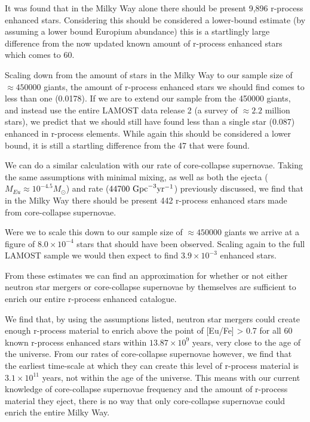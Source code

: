 \documentclass[a4paper,fleqn,usenatbib]{mnras}
\begin{document}
    It was found that in the Milky Way alone there should be present 9,896 r-process enhanced stars. Considering this should be considered a lower-bound estimate (by assuming a lower bound Europium abundance) this is a startlingly large difference from the now updated known amount of r-process enhanced stars which comes to 60. 
    
    Scaling down from the amount of stars in the Milky Way to our sample size of $\approx450000$ giants, the amount of r-process enhanced stars we should find comes to less than one (0.0178). If we are to extend our sample from the 450000 giants, and instead use the entire LAMOST data release 2 (a survey of $\approx2.2$ million stars), we predict that we should still have found less than a single star (0.087)  enhanced in r-process elements. While again this should be considered a lower bound, it is still a startling difference from the 47 that were found.
    
    We can do a similar calculation with our rate of core-collapse supernovae. Taking the same assumptions with minimal mixing, as well as both the ejecta ($M_{Eu}\approx10^{-4.5} M_{\odot}$) and rate ($44700\ \rm{Gpc}^{-3} \rm{yr^{-1}}$) previously discussed, we find that in the Milky Way there should be present 442 r-process enhanced stars made from core-collapse supernovae.
    
    Were we to scale this down to our sample size of $\approx450000$ giants we arrive at a figure of $8.0\times10^{-4}$ stars that should have been observed. Scaling again to the full LAMOST sample we would then expect to find $3.9\times10^{-3}$ enhanced stars. 
    
    From these estimates we can find an approximation for whether or not either neutron star mergers or core-collapse supernovae by themselves are sufficient to enrich our entire r-process enhanced catalogue. 
    
    We find that, by using the assumptions listed, neutron star mergers could create enough r-process material to enrich above the point of [Eu/Fe] > 0.7 for all 60 known r-process enhanced stars within $13.87\times10^9$ years, very close to the age of the universe. From our rates of core-collapse supernovae however, we find that the earliest time-scale at which they can create this level of r-process material is $3.1\times10^{11}$ years, not within the age of the universe. This means with our current knowledge of core-collapse supernovae frequency and the amount of r-process material they eject, there is no way that only core-collapse supernovae could enrich the entire Milky Way.
    
\end{document}
